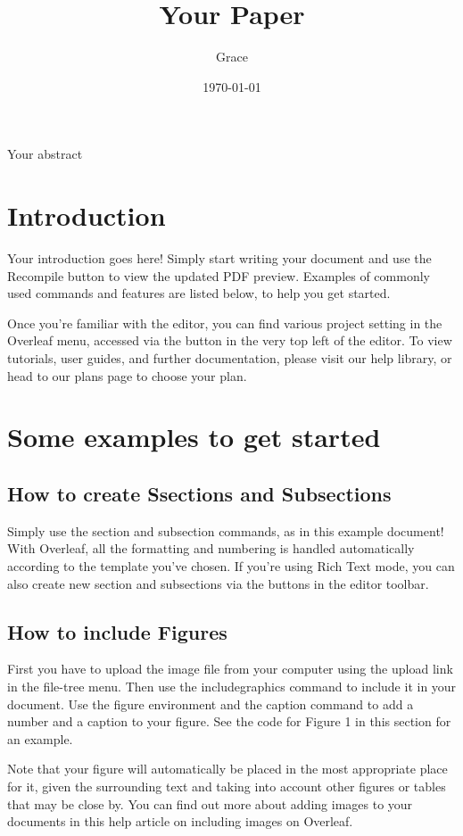 \documentclass{article}
\begin{document}
	\title{Your Paper}
	\author{Grace}
	\date{\today}
	\maketitle
	Your abstract
	\section{Introduction}
     Your introduction goes here! Simply start writing your document and use the Recompile button to	view the updated PDF preview. Examples of commonly used commands and features are listed below,	to help you get started.
     
      Once you’re familiar with the editor, you can find various project setting in the Overleaf menu, accessed via the button in the very top left of the editor. To view tutorials, user guides, and further documentation, please visit our help library, or head to our plans page to choose your plan.
	\section{Some examples to get started}
	\subsection{How to create Ssections and Subsections}
	Simply use the section and subsection commands, as in this example document! With Overleaf, all
	the formatting and numbering is handled automatically according to the template you’ve chosen. If
	you’re using Rich Text mode, you can also create new section and subsections via the buttons in the
	editor toolbar.
	\subsection{How to include Figures}
	First you have to upload the image file from your computer using the upload link in the file-tree menu.
	Then use the includegraphics command to include it in your document. Use the figure environment
	and the caption command to add a number and a caption to your figure. See the code for Figure 1 in this section for an example.
	
	Note that your figure will automatically be placed in the most appropriate place for it, given the
	surrounding text and taking into account other figures or tables that may be close by. You can find
	out more about adding images to your documents in this help article on including images on Overleaf.
	
\end{document}
